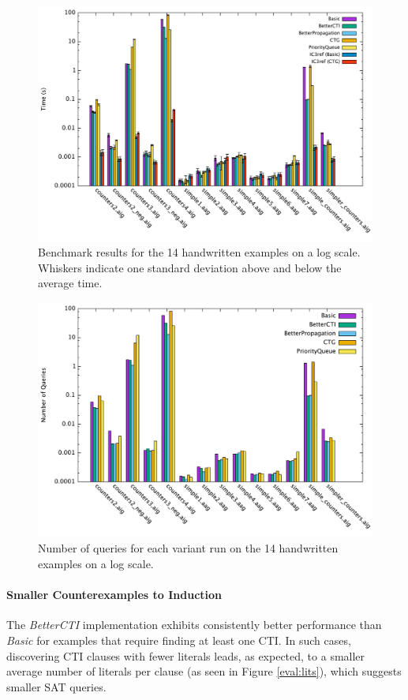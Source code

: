 \documentclass[12pt,a4paper,twoside,openright]{report}
\begin{document}
{{\begin{figure}[t]
\includegraphics[width=16cm]{handwritten.pdf}
\caption{Benchmark results for the 14 handwritten examples on a log scale. Whiskers
indicate one standard deviation above and below the average time.}
\label{eval:time}
\end{figure}

\begin{figure}[!ht]
\includegraphics[width=16cm]{numqueries.pdf}
\caption{Number of queries for each variant run on the 14 handwritten examples on a log scale.}
\label{eval:queries}
\end{figure}

\paragraph{Smaller Counterexamples to Induction}{
The \emph{BetterCTI} implementation exhibits consistently
better performance than \emph{Basic} for examples
that require finding at least one CTI. In such cases,
discovering CTI clauses with fewer literals leads, as expected, to a smaller average number of
literals per clause (as seen in Figure \ref{eval:lits}), which suggests smaller SAT queries.

}}}
\end{document}
